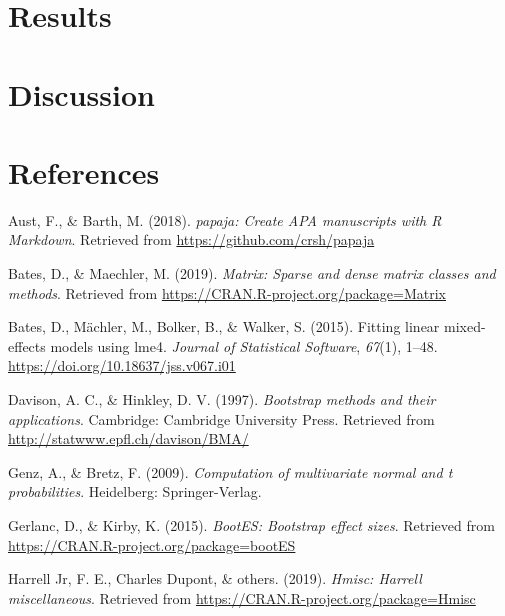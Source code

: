 \documentclass[man]{apa6}
\begin{document}
\hypertarget{results-1}{%
\section{Results}\label{results-1}}

\hypertarget{discussion}{%
\section{Discussion}\label{discussion}}

\newpage

\hypertarget{references}{%
\section{References}\label{references}}

\begingroup
\setlength{\parindent}{-0.5in}
\setlength{\leftskip}{0.5in}

\hypertarget{refs}{}
\leavevmode\hypertarget{ref-R-papaja}{}%
Aust, F., \& Barth, M. (2018). \emph{papaja: Create APA manuscripts with R Markdown}. Retrieved from \url{https://github.com/crsh/papaja}

\leavevmode\hypertarget{ref-R-Matrix}{}%
Bates, D., \& Maechler, M. (2019). \emph{Matrix: Sparse and dense matrix classes and methods}. Retrieved from \url{https://CRAN.R-project.org/package=Matrix}

\leavevmode\hypertarget{ref-R-lme4}{}%
Bates, D., Mächler, M., Bolker, B., \& Walker, S. (2015). Fitting linear mixed-effects models using lme4. \emph{Journal of Statistical Software}, \emph{67}(1), 1--48. \url{https://doi.org/10.18637/jss.v067.i01}

\leavevmode\hypertarget{ref-R-boot}{}%
Davison, A. C., \& Hinkley, D. V. (1997). \emph{Bootstrap methods and their applications}. Cambridge: Cambridge University Press. Retrieved from \url{http://statwww.epfl.ch/davison/BMA/}

\leavevmode\hypertarget{ref-R-mvtnorm}{}%
Genz, A., \& Bretz, F. (2009). \emph{Computation of multivariate normal and t probabilities}. Heidelberg: Springer-Verlag.

\leavevmode\hypertarget{ref-R-bootES}{}%
Gerlanc, D., \& Kirby, K. (2015). \emph{BootES: Bootstrap effect sizes}. Retrieved from \url{https://CRAN.R-project.org/package=bootES}

\leavevmode\hypertarget{ref-R-Hmisc}{}%
Harrell Jr, F. E., Charles Dupont, \& others. (2019). \emph{Hmisc: Harrell miscellaneous}. Retrieved from \url{https://CRAN.R-project.org/package=Hmisc}
\end{document}
